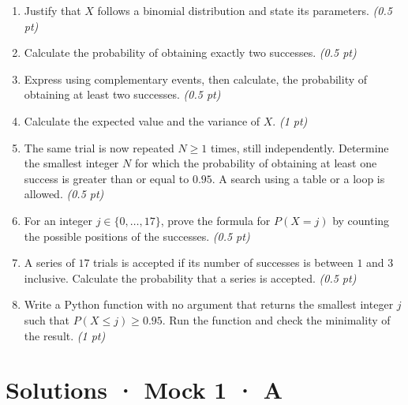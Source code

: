 \begin{enumerate}

\item Justify that $X$ follows a binomial distribution and state its parameters. \hfill\textit{(0.5 pt)}

\item Calculate the probability of obtaining exactly two successes. \hfill\textit{(0.5 pt)}

\item Express using complementary events, then calculate, the probability of obtaining at least two successes. \hfill\textit{(0.5 pt)}

\item Calculate the expected value and the variance of $X$. \hfill\textit{(1 pt)}

\item The same trial is now repeated $N\ge1$ times, still independently. Determine the smallest integer $N$ for which the probability of obtaining at least one success is greater than or equal to $\num{0,95}$. A search using a table or a loop is allowed. \hfill\textit{(0.5 pt)}

\item For an integer $j\in\{0,\ldots,17\}$, prove the formula for $P(X=j)$ by counting the possible positions of the successes. \hfill\textit{(0.5 pt)}

\item A series of $17$ trials is accepted if its number of successes is between $1$ and $3$ inclusive. Calculate the probability that a series is accepted. \hfill\textit{(0.5 pt)}

\item Write a Python function with no argument that returns the smallest integer $j$ such that $P(X\le j)\ge\num{0,95}$. Run the function and check the minimality of the result. \hfill\textit{(1 pt)}

\end{enumerate}

\ifmxteacher\mxnewpage

\section*{Solutions · Mock 1 · A}\label{cor:5-3}

